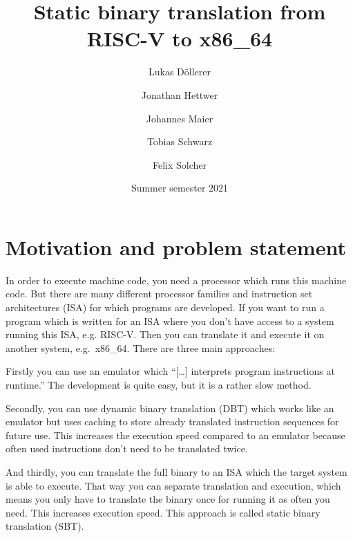 \documentclass[course=eragp]{aspdoc}
\author{Lukas Döllerer \and Jonathan Hettwer \and Johannes Maier \and Tobias Schwarz \and Felix Solcher}
\date{Summer semester 2021}
\title{Static binary translation from RISC-V to x86\_64}
\begin{document}
\maketitle

\tableofcontents

\pagebreak

\section{Motivation and problem statement}


In order to execute machine code, you need a processor which runs this machine code. But there are
many different processor families and instruction set architectures (ISA) for which programs are
developed. If you want to run a program which is written for an ISA where you don't have access to a
system running this ISA, e.g. RISC-V. Then you can translate it and execute it on another system,
e.g.\ x86\_64. There are three main approaches:

\par

Firstly you can use an emulator which ``[\ldots] interprets program instructions at
runtime.''\cite{binary_translation} The development is quite easy, but it is a rather slow method.

\par

Secondly, you can use dynamic binary translation (DBT) which works like an emulator but uses caching
to store already translated instruction sequences for future use. This increases the execution speed
compared to an emulator because often used instructions don't need to be translated
twice.\cite{binary_translation}

\par

And thirdly, you can translate the full binary to an ISA which the target system is able to execute.
That way you can separate translation and execution, which means you only have to translate the
binary once for running it as often you need. This increases execution speed. This approach is
called static binary translation (SBT).\cite{binary_translation}
\end{document}
